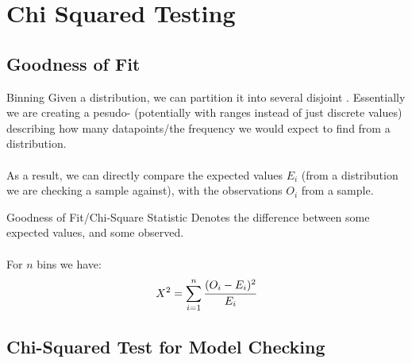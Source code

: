 \section{Chi Squared Testing}

\subsection{Goodness of Fit}
\begin{definitionbox}{Binning}
	Given a distribution, we can partition it into several disjoint . Essentially we are creating a pesudo- (potentially with ranges instead of just discrete values) describing how many datapoints/the frequency we would expect to find from a distribution.
	\\
	\\ As a result, we can directly compare the expected values $E_i$ (from a distribution we are checking a sample against), with the observations $O_i$ from a sample.
\end{definitionbox}
\begin{definitionbox}{Goodness of Fit/Chi-Square Statistic }
	Denotes the difference between some expected values, and some observed.
	\\
	\\ For $n$ bins we have:
	\[X^2 = \sum_{i=1}^n\cfrac{(O_i-E_i)^2}{E_i}\]
\end{definitionbox}
\subsection{Chi-Squared Test for Model Checking}

